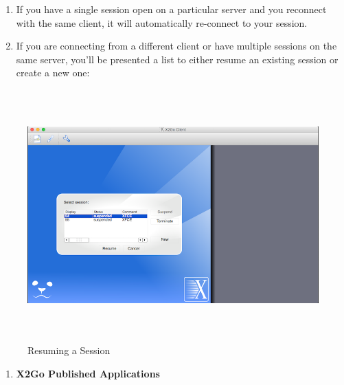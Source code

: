 \begin{enumerate}
	\def\labelenumi{\arabic{enumi}.}
	\setcounter{enumi}{14}
	\item
	If you have a single session open on a particular server and you
	reconnect with the same client, it will automatically re-connect to
	your session.
	\item
	If you are connecting from a different client or have multiple
	sessions on the same server, you'll be presented a list to either
	resume an existing session or create a new one:
\end{enumerate}
\begin{figure}
	\centering
	\includegraphics[width=6.26806in,height=3.8057in]{src/images/image10.png}
	\caption{Resuming a Session}
	\label{fig:fig10}
\end{figure}
\begin{enumerate}
	\def\labelenumi{\Alph{enumi}.}
	\setcounter{enumi}{5}
	\item
	\textbf{X2Go Published Applications}
\end{enumerate}

